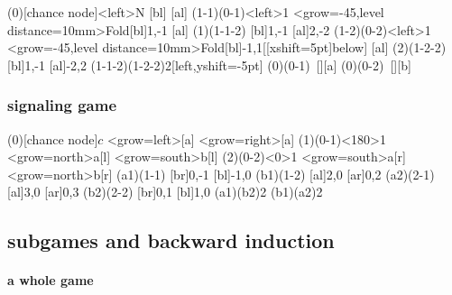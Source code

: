 \begin{tcblisting}{}
\begin{istgame}[scale=1.3]
\xtdistance{15mm}{30mm}
\istroot(0)[chance node]<left>{N}
  [bl]
  [al]
\endist
\setistactionlabelposition{6pt}{1pt} %
\xtdistance{15mm}{30mm}
\istroot(1-1)(0-1)<left>{1}
  \istb<grow=-45,level distance=10mm>{Fold}[bl]{1,-1}
  [al]
\endist
\xtdistance{12mm}{24mm}
\istroot(1)(1-1-2)
  [bl]{1,-1}
  [al]{2,-2}
\endist
\xtdistance{15mm}{30mm}
\istroot(1-2)(0-2)<left>{1}
  \istb<grow=-45,level distance=10mm>{Fold}[bl]{-1,1}[[xshift=5pt]below]
  [al]
\endist
\xtdistance{12mm}{24mm}
\istroot(2)(1-2-2)
  [bl]{1,-1}
  [al]{-2,2}
\endist
\xtInfoset(1-1-2)(1-2-2){2}[left,yshift=-5pt]
\xtActionLabel(0)(0-1){\ []}[a]
\xtActionLabel(0)(0-2){\ []}[b]
\end{istgame}
\end{tcblisting}

\subsubsection{signaling game}

\begin{tcblisting}{}
\begin{istgame}[scale=1.3]
\xtdistance{20mm}{20mm}
\istroot(0)[chance node]{$c$}
  \istb<grow=left>{}[a]
  \istb<grow=right>{}[a]
  \endist
\xtdistance{10mm}{20mm}
\istroot(1)(0-1)<180>{1}
  \istb<grow=north>{a}[l]
  \istb<grow=south>{b}[l]
  \endist
\istroot(2)(0-2)<0>{1}
  \istb<grow=south>{a}[r]
  \istb<grow=north>{b}[r]
  \endist
\istroot[north](a1)(1-1)
  [br]{0,-1}
  [bl]{-1,0}
  \endist
\istroot(b1)(1-2)
  [al]{2,0}
  [ar]{0,2}
  \endist
\istroot(a2)(2-1)
  [al]{3,0}
  [ar]{0,3}
  \endist
\istroot[north](b2)(2-2)
  [br]{0,1}
  [bl]{1,0}
  \endist
\xtInfoset(a1)(b2){2}
\xtInfoset(b1)(a2){2}
\end{istgame}
\end{tcblisting}


\clearpage
\subsection{subgames and backward induction}

\paragraph{a whole game} ~

